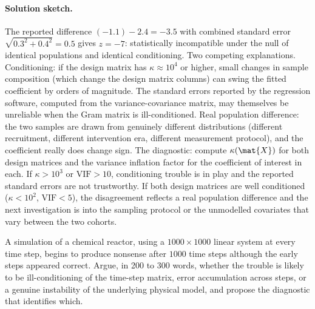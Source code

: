 \paragraph{Solution sketch.}
The reported difference $(-1.1) - 2.4 = -3.5$ with combined
standard error $\sqrt{0.3^{2} + 0.4^{2}} = 0.5$ gives $z = -7$:
statistically incompatible under the null of identical populations
and identical conditioning. Two competing explanations. Conditioning:
if the design matrix has $\kappa \approx 10^{4}$ or higher, small
changes in sample composition (which change the design matrix
columns) can swing the fitted coefficient by orders of magnitude.
The standard errors reported by the regression software, computed
from the variance-covariance matrix, may themselves be unreliable
when the Gram matrix is ill-conditioned. Real population difference:
the two samples are drawn from genuinely different distributions
(different recruitment, different intervention era, different
measurement protocol), and the coefficient really does change
sign. The diagnostic: compute $\kappa(\mat{X})$ for both design
matrices and the variance inflation factor for the coefficient of
interest in each. If $\kappa > 10^{3}$ or $\mathrm{VIF} > 10$,
conditioning trouble is in play and the reported standard errors
are not trustworthy. If both design matrices are well conditioned
($\kappa < 10^{2}$, $\mathrm{VIF} < 5$), the disagreement reflects
a real population difference and the next investigation is into
the sampling protocol or the unmodelled covariates that vary
between the two cohorts.

\begin{exercise}
A simulation of a chemical reactor, using a $1000 \times 1000$
linear system at every time step, begins to produce nonsense
after $1000$ time steps although the early steps appeared
correct. Argue, in 200 to 300 words, whether the trouble is
likely to be ill-conditioning of the time-step matrix, error
accumulation across steps, or a genuine instability of the
underlying physical model, and propose the diagnostic that
identifies which.
\end{exercise}

